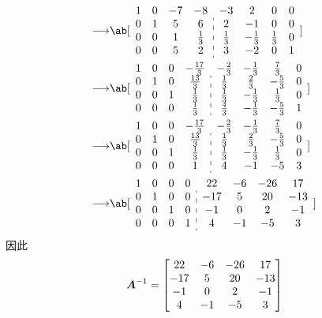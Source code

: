 \begin{problem}
\begin{solution}
\begin{enumerate}
$$\begin{aligned}
				\longrightarrow & \ab[\begin{array}{cccc:cccc}
					1 & 0 & -7 & -8 & -3 & 2 & 0 & 0 \\
					0 & 1 & 5 & 6 & 2 & -1 & 0 & 0 \\
					0 & 0 & 1 & \frac{1}{3} & \frac{1}{3} & -\frac{1}{3} & \frac{1}{3} & 0 \\
					0 & 0 & 5 & 2 & 3 & -2 & 0 & 1
				\end{array}] \\
				\longrightarrow & \ab[\begin{array}{cccc:cccc}
					1 & 0 & 0 & -\frac{17}{3} & -\frac{2}{3} & -\frac{1}{3} & \frac{7}{3} & 0 \\
					0 & 1 & 0 & \frac{13}{3} & \frac{1}{3} & \frac{2}{3} & -\frac{5}{3} & 0 \\
					0 & 0 & 1 & \frac{1}{3} & \frac{1}{3} & -\frac{1}{3} & \frac{1}{3} & 0 \\
					0 & 0 & 0 & \frac{1}{3} & \frac{4}{3} & -\frac{1}{3} & -\frac{5}{3} & 1
				\end{array}] \\
				\longrightarrow & \ab[\begin{array}{cccc:cccc}
					1 & 0 & 0 & -\frac{17}{3} & -\frac{2}{3} & -\frac{1}{3} & \frac{7}{3} & 0 \\
					0 & 1 & 0 & \frac{13}{3} & \frac{1}{3} & \frac{2}{3} & -\frac{5}{3} & 0 \\
					0 & 0 & 1 & \frac{1}{3} & \frac{1}{3} & -\frac{1}{3} & \frac{1}{3} & 0 \\
					0 & 0 & 0 & 1 & 4 & -1 & -5 & 3
				\end{array}] \\
				\longrightarrow & \ab[\begin{array}{cccc:cccc}
					1 & 0 & 0 & 0 & 22 & -6 & -26 & 17 \\
					0 & 1 & 0 & 0 & -17 & 5 & 20 & -13 \\
					0 & 0 & 1 & 0 & -1 & 0 & 2 & -1 \\
					0 & 0 & 0 & 1 & 4 & -1 & -5 & 3
				\end{array}]
			\end{aligned}
			$$
			因此
			$$
			\boldsymbol{A}^{-1} = \begin{bmatrix}
				22 & -6 & -26 & 17 \\
				-17 & 5 & 20 & -13 \\
				-1 & 0 & 2 & -1 \\
				4 & -1 & -5 & 3
			\end{bmatrix}
			$$


\end{enumerate}
\end{solution}
\end{problem}
